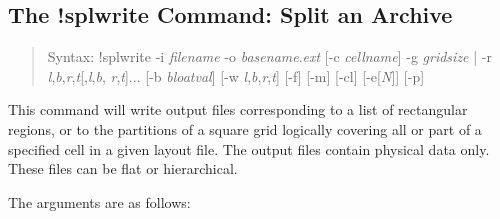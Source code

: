 \subsection{The {\cb !splwrite} Command: Split an Archive}
\label{splwrite}
\begin{quote}
Syntax: {\vt !splwrite}
 {\vt -i} {\it filename}
      {\vt -o} {\it basename\/}.{\it ext} [{\vt -c} {\it cellname\/}]
      {\vt -g} {\it gridsize} {\vt |} {\vt -r}
      {\it l\/},{\it b\/},{\it r\/},{\it t\/}[,{\it l\/},{\it b\/},{\it
      r\/},{\it t\/}]...
      [{\vt -b} {\it bloatval\/}]
      [{\vt -w} {\it l\/},{\it b\/},{\it r\/},{\it t\/}]
      [{\vt -f}] [{\vt -m}] [{\vt -cl}] [{\vt -e}[{\it N\/}]] [{\vt -p}]
\end{quote}
This command will write output files corresponding to a list of
rectangular regions, or to the partitions of a square grid logically
covering all or part of a specified cell in a given layout file.  The
output files contain physical data only.  These files can be flat or
hierarchical.

The arguments are as follows:

